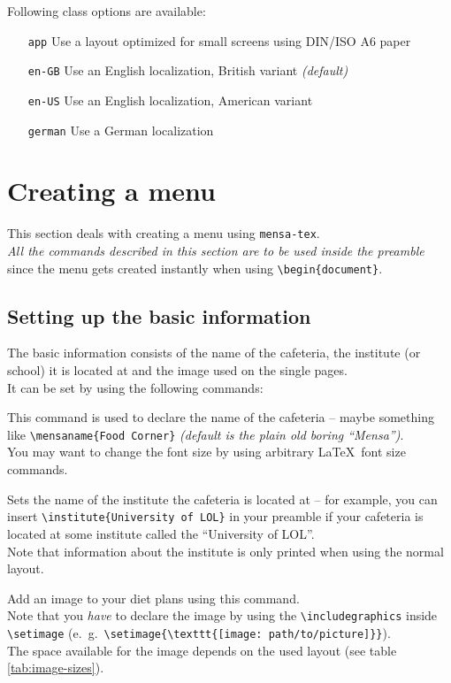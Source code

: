 \documentclass[11pt]{ltxdoc}
\begin{document}
	\bigskip
	Following class options are available:
	\begin{itemize}
		\item[\texttt{app}] Use a layout optimized for small screens using DIN/ISO A6 paper
		\item[\texttt{en-GB}] Use an English localization, British variant \textit{(default)}
		\item[\texttt{en-US}] Use an English localization, American variant
		\item[\texttt{german}] Use a German localization
	\end{itemize}



	\section{Creating a menu}
	This section deals with creating a menu using \texttt{mensa-tex}. \\
	\textit{\color{red} All the commands described in this section are to be used inside the preamble} since the menu gets created instantly when using \verb|\begin{document}|.
	
	\subsection{Setting up the basic information}
	The basic information consists of the name of the cafeteria, the institute (or school) it is located at and the image used on the single pages. \\
	It can be set by using the following commands:
	
	\medskip
	\DescribeMacro{\mensaname}
	This command is used to declare the name of the cafeteria -- maybe something like \verb|\mensaname{Food Corner}| \textit{(default is the plain old boring \enquote{Mensa})}. \\
	You may want to change the font size by using arbitrary \LaTeX\ font size commands.
	
	\medskip
	\DescribeMacro{\institute}
	Sets the name of the institute the cafeteria is located at -- for example, you can insert \verb|\institute{University of LOL}| in your preamble if your cafeteria is located at some institute called the \enquote{University of LOL}. \\
	Note that information about the institute is only printed when using the normal layout.

	\medskip
	\DescribeMacro{\setimage}
	Add an image to your diet plans using this command. \\
	Note that you \textit{have} to declare the image by using the \verb|\includegraphics| inside \verb|\setimage| (e.~g.~\verb|\setimage{\texttt{[image: path/to/picture]}}|). \\
	The space available for the image depends on the used layout (see table \ref{tab:image-sizes}).
	
\end{document}
